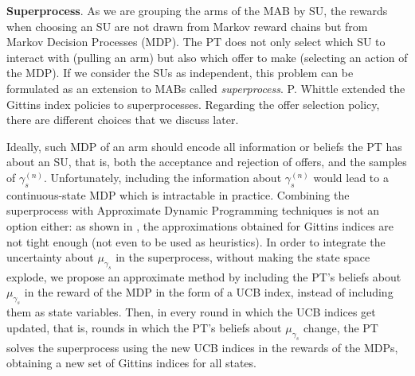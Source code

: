 \textbf{Superprocess}. 
As we are grouping the arms of the MAB by SU, the rewards when choosing an SU are not drawn from Markov reward chains but from Markov Decision Processes (MDP). The PT does not only select which SU to interact with (pulling an arm) but also which offer to make (selecting an action of the MDP). 
If we consider the SUs as independent, this problem can be formulated as an extension to MABs called \textit{superprocess}. P. Whittle \cite{ref:Whittle1980} extended the Gittins index policies to superprocesses. Regarding the offer selection policy, there are different choices that we discuss later.


Ideally, such MDP of an arm should encode all information or beliefs the PT has about an SU, that is, both the acceptance and rejection of offers, and the samples of $\gamma_s^{(n)}$. 
Unfortunately, including the information about $\gamma_s^{(n)}$ would lead to a continuous-state MDP which is intractable in practice. 
Combining the superprocess with Approximate Dynamic Programming techniques is not an option either: as shown in \cite{ref:Pandey2007}, the approximations obtained for Gittins indices are not tight enough (not even to be used as heuristics). In order to integrate the uncertainty about $\mu_{\gamma_s}$ in the superprocess, without making the state space explode, we propose an approximate method by including the PT's beliefs about $\mu_{\gamma_s}$ in the reward of the MDP in the form of a UCB index, instead of including them as state variables. Then, in every round in which the UCB indices get updated, that is, rounds in which the PT's beliefs about $\mu_{\gamma_s}$ change, the PT solves the superprocess using the new UCB indices in the rewards of the MDPs, obtaining a new set of Gittins indices for all states.


